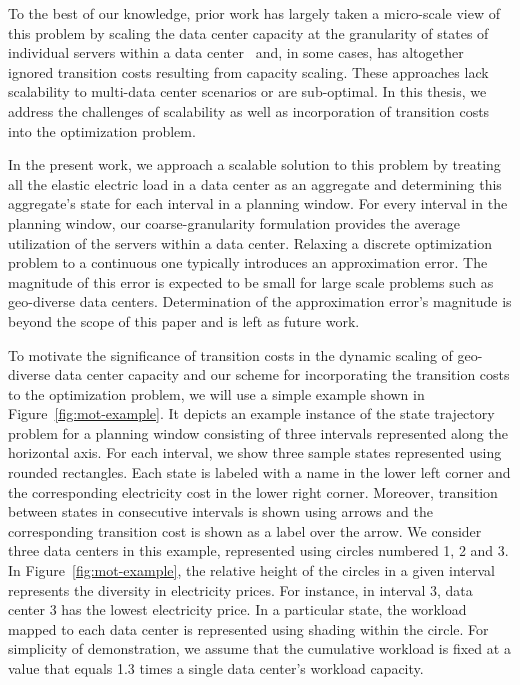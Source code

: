 To the best of our knowledge, prior work has largely taken a micro-scale view of this problem by scaling the data center capacity at the granularity of states of individual servers within a data center~\cite{Li:Optimal:TSG:2012,LinInfocom11,serverEnergy,Mazzucco2012415,rao2010,qureshi2009cutting} and, in some cases, has altogether ignored transition costs resulting from capacity scaling. These approaches lack scalability to multi-data center scenarios or are sub-optimal. In this thesis, we address the challenges of scalability as well as incorporation of transition costs into the optimization problem.

In the present work, we approach a scalable solution to this problem by treating all the elastic electric load in a data center as an aggregate and determining this aggregate's state for each interval in a planning window. For every interval in the planning window, our coarse-granularity formulation provides the average utilization of the servers within a data center. Relaxing a discrete optimization problem to a continuous one typically introduces an approximation error. The magnitude of this error is expected to be small for large scale problems such as geo-diverse data centers. Determination of the approximation error's magnitude is beyond the scope of this paper and is left as future work.

To motivate the significance of transition costs in the dynamic scaling of geo-diverse data center capacity and our scheme for incorporating the transition costs to the optimization problem, we will use a simple example shown in Figure~\ref{fig:mot-example}. It depicts an example instance of the
state trajectory problem for a planning window consisting of
three intervals represented along the horizontal axis. For each interval, we show three sample states represented using rounded rectangles. Each state is labeled with a name in the lower left corner and the corresponding electricity cost in the lower right corner. Moreover, transition between states in consecutive intervals is shown using arrows and the corresponding transition cost is shown as a label over the arrow. We consider three data centers in this example, represented using circles
numbered 1, 2 and 3. In Figure~\ref{fig:mot-example}, the relative height of the circles in a given interval represents the diversity in electricity prices. For instance, in interval 3, data center 3 has the lowest electricity price. In a particular state, the workload mapped to each data center is represented using shading within the circle. For simplicity of demonstration, we assume that the cumulative
workload is fixed at a value that equals 1.3 times a single
data center's workload capacity. 


